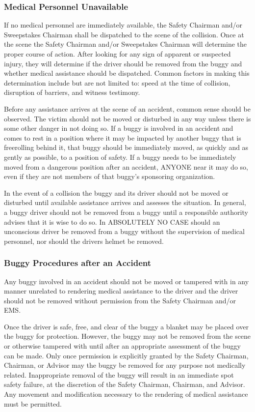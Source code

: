 	\subsubsection{Medical Personnel Unavailable}
	If no medical personnel are immediately available, the Safety Chairman and/or Sweepstakes Chairman shall be dispatched to the scene of the collision. Once at the scene the Safety Chairman and/or Sweepstakes Chairman will determine the proper course of action. After looking for any sign of apparent or suspected injury, they will determine if the driver should be removed from the buggy and whether medical assistance should be dispatched. Common factors in making this determination include but are not limited to: speed at the time of collision, disruption of barriers, and witness testimony.

	Before any assistance arrives at the scene of an accident, common sense should be observed. The victim should not be moved or disturbed in any way unless there is some other danger in not doing so. If a buggy is involved in an accident and comes to rest in a position where it may be impacted by another buggy that is freerolling behind it, that buggy should be immediately moved, as quickly and as gently as possible, to a position of safety. If a buggy needs to be immediately moved from a dangerous position after an accident, ANYONE near it may do so, even if they are not members of that buggy's sponsoring organization.

	In the event of a collision the buggy and its driver should not be moved or disturbed until available assistance arrives and assesses the situation. In general, a buggy driver should not be removed from a buggy until a responsible authority advises that it is wise to do so. In ABSOLUTELY NO CASE should an unconscious driver be removed from a buggy without the supervision of medical personnel, nor should the drivers helmet be removed.

	\subsubsection{Buggy Procedures after an Accident}
	Any buggy involved in an accident should not be moved or tampered with in any manner unrelated to rendering medical assistance to the driver and the driver should not be removed without permission from the Safety Chairman and/or EMS. 
	
	Once the driver is safe, free, and clear of the buggy a blanket may be placed over the buggy for protection. However, the buggy may not be removed from the scene or otherwise tampered with until after an appropriate assessment of the buggy can be made. Only once permission is explicitly granted by the Safety Chairman, Chairman, or Advisor may the buggy be removed for any purpose not medically related. Inappropriate removal of the buggy will result in an immediate spot safety failure, at the discretion of the Safety Chairman, Chairman, and Advisor. Any movement and modification necessary to the rendering of medical assistance must be permitted.
	
